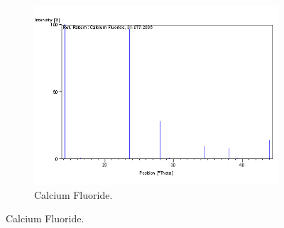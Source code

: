 \documentclass{article}
\begin{document}
\begin{appendices}
\begin{figure}[h]
	\begin{subfigure}{0.45\textwidth}
		\centering
		\includegraphics[width=\textwidth]{Figures/CaF2Peaks.png}
		\caption{Calcium Fluoride.}
		\label{fig:CaF2Peaks}
	\end{subfigure}
	\label{fig:PCPDFPeaks}
\end{figure}

\end{appendices}

\pagebreak{}

 
 
\end{document}
